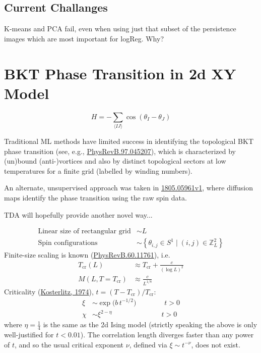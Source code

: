 \documentclass[11pt]{article}
\begin{document}
\subsection{Current Challanges}
K-means and PCA fail, even when using just that subset of the persistence images which are most important for logReg. Why?


\newpage
\section{BKT Phase Transition in 2d XY Model}
\begin{equation}
	H = - \sum_{\langle IJ\rangle}\cos{(\theta_I-\theta_J)}
\end{equation}

Traditional ML methods have limited success in identifying the topological BKT phase transition (see, e.g., \href{https://journals.aps.org/prb/pdf/10.1103/PhysRevB.97.045207}{PhysRevB.97.045207}), which is characterized by (un)bound (anti-)vortices and also by distinct topological sectors at low temperatures for a finite grid (labelled by winding numbers).

An alternate, unsupervised approach was taken in \href{https://arxiv.org/pdf/1805.05961v1.pdf}{1805.05961v1}, where diffusion maps identify the phase transition using the raw spin data.

TDA will hopefully provide another novel way...


\begin{align*}
	\text{Linear size of rectangular grid} &\sim L\\
	\text{Spin configurations} &\sim \left\{ \theta_{i,j}\in S^1\;|\;(i,j)\in\mathbb{Z}_L^2 \right\}
\end{align*}
Finite-size scaling is known (\href{https://journals.aps.org/prb/pdf/10.1103/PhysRevB.60.11761}{PhysRevB.60.11761}), i.e.
\begin{align*}
	T_\text{cr}(L) &\approx T_\text{cr} + \frac{c}{(\log{L})^2}\\
	M(L,T=T_\text{cr}) &\approx \frac{c}{L^{1/8}}
\end{align*}
Criticality (\href{http://kelvin.phys.s.u-tokyo.ac.jp/lecture/low_T_phys/2017/4_Kosterlitz(J.Phys.C)1974.pdf}{Kosterlitz, 1974}), $t=(T-T_\text{cr})/T_\text{cr}$:
\begin{align*}
	\xi &\sim \exp\big(b\,t^{-1/2}\big) \qquad\qquad t>0\\
	\chi &\sim \xi^{2-\eta} \qquad\qquad\hspace{36pt} t>0
\end{align*}
where $\eta=\frac{1}{4}$ is the same as the 2d Ising model (strictly speaking the above is only well-justified for $t<0.01$). The correlation length diverges faster than any power of $t$, and so the usual critical exponent $\nu$, defined via $\xi\sim t^{-\nu}$, does not exist.
\end{document}

